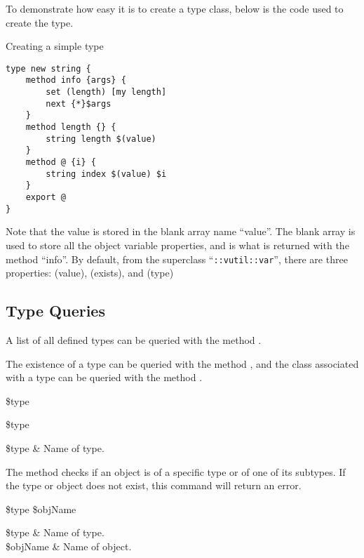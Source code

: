 \documentclass{article}
\begin{document}
To demonstrate how easy it is to create a type class, below is the code used to create the  type.
\begin{example}{Creating a simple type}
\begin{lstlisting}
type new string {
    method info {args} {
        set (length) [my length]
        next {*}$args
    }
    method length {} {
        string length $(value)
    }
    method @ {i} {
        string index $(value) $i
    }
    export @
}
\end{lstlisting}
\end{example}

Note that the value is stored in the blank array name ``value''. 
The blank array is used to store all the object variable properties, and is what is returned with the method ``info''.
By default, from the superclass ``\texttt{::vutil::var}'', there are three properties: (value), (exists), and (type)

\clearpage
\subsection{Type Queries}
A list of all defined types can be queried with the method . 
\begin{syntax}
\end{syntax}

The existence of a type can be queried with the method , and 
the class associated with a type can be queried with the method . 
\begin{syntax}
 \$type
\end{syntax}
\begin{syntax}
 \$type
\end{syntax}
\begin{args}
\$type & Name of type. 
\end{args}

The method  checks if an object is of a specific type or of one of its subtypes.
If the type or object does not exist, this command will return an error.

\begin{syntax}
 \$type \$objName
\end{syntax}
\begin{args}
\$type & Name of type. \\
\$objName & Name of object.
\end{args}
\end{document}
